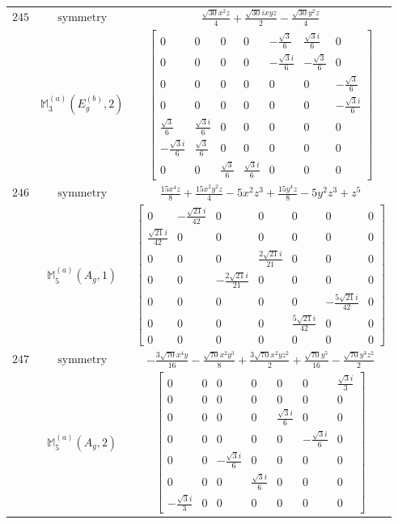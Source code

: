 \documentclass[fleqn,8pt,landscape]{jsarticle}
\begin{document}
\begin{longtable}{ccc}
$ 245 $ & $ \text{symmetry} $ & $ \frac{\sqrt{30} x^{2} z}{4} + \frac{\sqrt{30} i x y z}{2} - \frac{\sqrt{30} y^{2} z}{4} $ \\
$  $ & $ \mathbb{M}_{3}^{(a)}(E_{g}^{(b)},2) $ & $ \begin{bmatrix} 0 & 0 & 0 & 0 & - \frac{\sqrt{3}}{6} & \frac{\sqrt{3} i}{6} & 0 \\ 0 & 0 & 0 & 0 & - \frac{\sqrt{3} i}{6} & - \frac{\sqrt{3}}{6} & 0 \\ 0 & 0 & 0 & 0 & 0 & 0 & - \frac{\sqrt{3}}{6} \\ 0 & 0 & 0 & 0 & 0 & 0 & - \frac{\sqrt{3} i}{6} \\ \frac{\sqrt{3}}{6} & \frac{\sqrt{3} i}{6} & 0 & 0 & 0 & 0 & 0 \\ - \frac{\sqrt{3} i}{6} & \frac{\sqrt{3}}{6} & 0 & 0 & 0 & 0 & 0 \\ 0 & 0 & \frac{\sqrt{3}}{6} & \frac{\sqrt{3} i}{6} & 0 & 0 & 0 \end{bmatrix} $ \\ \hline
$ 246 $ & $ \text{symmetry} $ & $ \frac{15 x^{4} z}{8} + \frac{15 x^{2} y^{2} z}{4} - 5 x^{2} z^{3} + \frac{15 y^{4} z}{8} - 5 y^{2} z^{3} + z^{5} $ \\
$  $ & $ \mathbb{M}_{5}^{(a)}(A_{g},1) $ & $ \begin{bmatrix} 0 & - \frac{\sqrt{21} i}{42} & 0 & 0 & 0 & 0 & 0 \\ \frac{\sqrt{21} i}{42} & 0 & 0 & 0 & 0 & 0 & 0 \\ 0 & 0 & 0 & \frac{2 \sqrt{21} i}{21} & 0 & 0 & 0 \\ 0 & 0 & - \frac{2 \sqrt{21} i}{21} & 0 & 0 & 0 & 0 \\ 0 & 0 & 0 & 0 & 0 & - \frac{5 \sqrt{21} i}{42} & 0 \\ 0 & 0 & 0 & 0 & \frac{5 \sqrt{21} i}{42} & 0 & 0 \\ 0 & 0 & 0 & 0 & 0 & 0 & 0 \end{bmatrix} $ \\ \hline
$ 247 $ & $ \text{symmetry} $ & $ - \frac{3 \sqrt{70} x^{4} y}{16} - \frac{\sqrt{70} x^{2} y^{3}}{8} + \frac{3 \sqrt{70} x^{2} y z^{2}}{2} + \frac{\sqrt{70} y^{5}}{16} - \frac{\sqrt{70} y^{3} z^{2}}{2} $ \\
$  $ & $ \mathbb{M}_{5}^{(a)}(A_{g},2) $ & $ \begin{bmatrix} 0 & 0 & 0 & 0 & 0 & 0 & \frac{\sqrt{3} i}{3} \\ 0 & 0 & 0 & 0 & 0 & 0 & 0 \\ 0 & 0 & 0 & 0 & \frac{\sqrt{3} i}{6} & 0 & 0 \\ 0 & 0 & 0 & 0 & 0 & - \frac{\sqrt{3} i}{6} & 0 \\ 0 & 0 & - \frac{\sqrt{3} i}{6} & 0 & 0 & 0 & 0 \\ 0 & 0 & 0 & \frac{\sqrt{3} i}{6} & 0 & 0 & 0 \\ - \frac{\sqrt{3} i}{3} & 0 & 0 & 0 & 0 & 0 & 0 \end{bmatrix} $ \\ \hline

\end{longtable}
\end{document}

